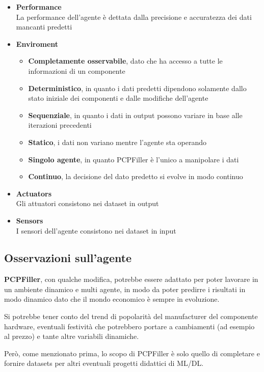 \documentclass[12pt]{report}
\begin{document}
\begin{itemize}
	\item\textbf{Performance}\\
		La performance dell'agente è dettata dalla precisione e accuratezza dei dati mancanti predetti
	\item\textbf{Enviroment}
		\begin{itemize}
			\item \textbf{Completamente osservabile}, dato che ha accesso a tutte le informazioni di un componente
			\item \textbf{Deterministico}, in quanto i dati predetti dipendono solamente dallo stato iniziale dei componenti e dalle modifiche dell'agente
			\item \textbf{Sequenziale}, in quanto i dati in output possono variare in base alle iterazioni precedenti
			\item \textbf{Statico}, i dati non variano mentre l'agente sta operando
			\item \textbf{Singolo agente}, in quanto PCPFiller è l'unico a manipolare i dati
			\item \textbf{Continuo}, la decisione del dato predetto si evolve in modo continuo
		\end{itemize}
	\item\textbf{Actuators}\\
		Gli attuatori consistono nei dataset in output
	\item\textbf{Sensors}\\
		I sensori dell'agente consistono nei dataset in input
\end{itemize}

\subsection{Osservazioni sull'agente}

\textbf{PCPFiller}, con qualche modifica, potrebbe essere adattato per poter lavorare in un ambiente
dinamico e multi agente, in modo da poter predirre i risultati in modo dinamico dato che il mondo
economico è sempre in evoluzione.

Si potrebbe tener conto del trend di popolarità del manufacturer del componente
hardware, eventuali festività che potrebbero portare a cambiamenti (ad esempio al prezzo) e tante
altre variabili dinamiche.

Però, come menzionato prima, lo scopo di PCPFiller è solo quello di completare e fornire datasets per
altri eventuali progetti didattici di ML/DL.
\end{document}
